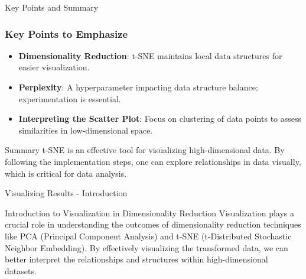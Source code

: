 \documentclass[aspectratio=169]{beamer}
\begin{document}
\begin{frame}[fragile]{Key Points and Summary}
  \frametitle{Key Points to Emphasize}

  \begin{itemize}
    \item \textbf{Dimensionality Reduction}: t-SNE maintains local data structures for easier visualization.
    \item \textbf{Perplexity}: A hyperparameter impacting data structure balance; experimentation is essential.
    \item \textbf{Interpreting the Scatter Plot}: Focus on clustering of data points to assess similarities in low-dimensional space.
  \end{itemize}

  \begin{block}{Summary}
    t-SNE is an effective tool for visualizing high-dimensional data. By following the implementation steps, one can explore relationships in data visually, which is critical for data analysis.
  \end{block}
\end{frame}

\begin{frame}[fragile]{Visualizing Results - Introduction}
    \begin{block}{Introduction to Visualization in Dimensionality Reduction}
        Visualization plays a crucial role in understanding the outcomes of dimensionality reduction techniques like PCA (Principal Component Analysis) and t-SNE (t-Distributed Stochastic Neighbor Embedding). 
        By effectively visualizing the transformed data, we can better interpret the relationships and structures within high-dimensional datasets.
    \end{block}
\end{frame}
\end{document}
